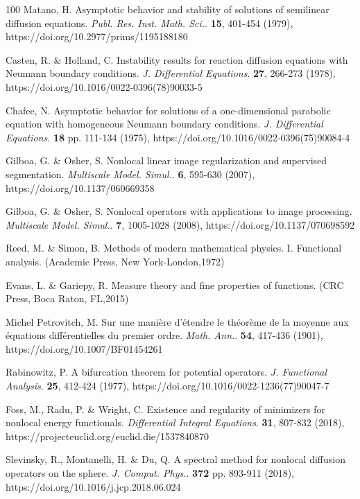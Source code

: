 \documentclass[12pt, a4paper]{article}
\theoremstyle{break}
\theoremstyle{break}
\theoremstyle{break}
\theoremstyle{break}
\theoremstyle{break}
\begin{document}
\begin{thebibliography}{100}
    Matano, H. Asymptotic behavior and stability of solutions of semilinear diffusion equations. {\em Publ. Res. Inst. Math. Sci.}. \textbf{15}, 401-454 (1979), https://doi.org/10.2977/prims/1195188180
    
    Casten, R. \& Holland, C. Instability results for reaction diffusion equations with Neumann boundary conditions. {\em J. Differential Equations}. \textbf{27}, 266-273 (1978), https://doi.org/10.1016/0022-0396(78)90033-5
    
    Chafee, N. Asymptotic behavior for solutions of a one-dimensional parabolic equation with homogeneous Neumann boundary conditions. {\em J. Differential Equations}. \textbf{18} pp. 111-134 (1975), https://doi.org/10.1016/0022-0396(75)90084-4
    
    Gilboa, G. \& Osher, S. Nonlocal linear image regularization and supervised segmentation. {\em Multiscale Model. Simul.}. \textbf{6}, 595-630 (2007), https://doi.org/10.1137/060669358
    
    Gilboa, G. \& Osher, S. Nonlocal operators with applications to image processing. {\em Multiscale Model. Simul.}. \textbf{7}, 1005-1028 (2008), https://doi.org/10.1137/070698592
    
    Reed, M. \& Simon, B. Methods of modern mathematical physics. I. Functional analysis. (Academic Press, New York-London,1972)
    
    Evans, L. \& Gariepy, R. Measure theory and fine properties of functions. (CRC Press, Boca Raton, FL,2015)
    
    Michel Petrovitch, M. Sur une manière d'étendre le théorème de la moyenne aux équations différentielles du premier ordre. {\em Math. Ann.}. \textbf{54}, 417-436 (1901), https://doi.org/10.1007/BF01454261
    
    Rabinowitz, P. A bifurcation theorem for potential operators. {\em J. Functional Analysis}. \textbf{25}, 412-424 (1977), https://doi.org/10.1016/0022-1236(77)90047-7
    
    Foss, M., Radu, P. \& Wright, C. Existence and regularity of minimizers for nonlocal energy functionals. {\em Differential Integral Equations}. \textbf{31}, 807-832 (2018), https://projecteuclid.org/euclid.die/1537840870
    
    Slevinsky, R., Montanelli, H. \& Du, Q. A spectral method for nonlocal diffusion operators on the sphere. {\em J. Comput. Phys.}. \textbf{372} pp. 893-911 (2018), https://doi.org/10.1016/j.jcp.2018.06.024
    

\end{thebibliography}
\end{document}
